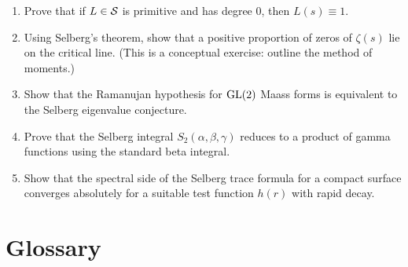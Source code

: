 \begin{enumerate}
    \item [I] Prove that if \(L \in \mathcal{S}\) is primitive and has degree 0, then \(L(s) \equiv 1\).
    \item [I] Using Selberg's theorem, show that a positive proportion of zeros of \(\zeta(s)\) lie on the critical line. (This is a conceptual exercise: outline the method of moments.)
    \item [I] Show that the Ramanujan hypothesis for \(\operatorname{GL}(2)\) Maass forms is equivalent to the Selberg eigenvalue conjecture.
    \item [B] Prove that the Selberg integral \(S_2(\alpha, \beta, \gamma)\) reduces to a product of gamma functions using the standard beta integral.
    \item [I] Show that the spectral side of the Selberg trace formula for a compact surface converges absolutely for a suitable test function \(h(r)\) with rapid decay.
\end{enumerate}

\section*{Glossary}


